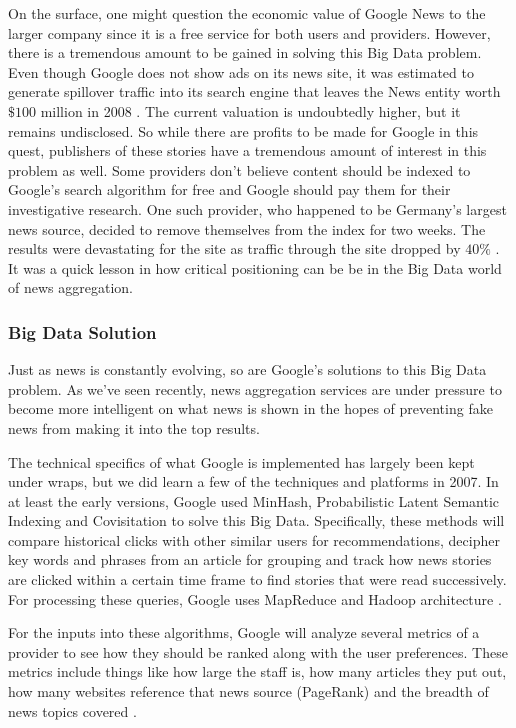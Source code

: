 \documentclass[sigconf]{acmart}
\begin{document}
On the surface, one might question the economic value of Google News to the larger company since it is a free service for both users and providers. However, there is a tremendous amount to be gained in solving this Big Data problem. Even though Google does not show ads on its news site, it was estimated to generate spillover traffic into its search engine that leaves the News entity worth $\$100$ million in 2008 \cite{newsvalue}. The current valuation is undoubtedly higher, but it remains undisclosed. So while there are profits to be made for Google in this quest, publishers of these stories have a tremendous amount of interest in this problem as well. Some providers don't believe content should be indexed to Google's search algorithm for free and Google should pay them for their investigative research. One such provider, who happened to be Germany's largest news source, decided to remove themselves from the index for two weeks. The results were devastating for the site as traffic through the site dropped by $40\%$ \cite{springer}. It was a quick lesson in how critical positioning can be be in the Big Data world of news aggregation.

\subsubsection{Big Data Solution}
Just as news is constantly evolving, so are Google's solutions to this Big Data problem. As we've seen recently, news aggregation services are under pressure to become more intelligent on what news is shown in the hopes of preventing fake news from making it into the top results. 

The technical specifics of what Google is implemented has largely been kept under wraps, but we did learn a few of the techniques and platforms in 2007. In at least the early versions, Google used MinHash, Probabilistic Latent Semantic Indexing and Covisitation to solve this Big Data. Specifically, these methods will compare historical clicks with other similar users for recommendations, decipher key words and phrases from an article for grouping and track how news stories are clicked within a certain time frame to find stories that were read successively. For processing these queries, Google uses MapReduce and Hadoop architecture \cite{googlearch}.

For the inputs into these algorithms, Google will analyze several metrics of a provider to see how they should be ranked along with the user preferences. These metrics include things like how large the staff is, how many articles they put out, how many websites reference that news source (PageRank) and the breadth of news topics covered \cite{sauce}. 
\end{document}

